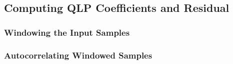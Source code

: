 
\subsection{Computing QLP Coefficients and Residual}
\label{alac:compute_qlp_coeffs}


\clearpage

\subsubsection{Windowing the Input Samples}
\label{alac:window}
{
  
}

\subsubsection{Autocorrelating Windowed Samples}
\label{alac:autocorrelate}
{
  
}

